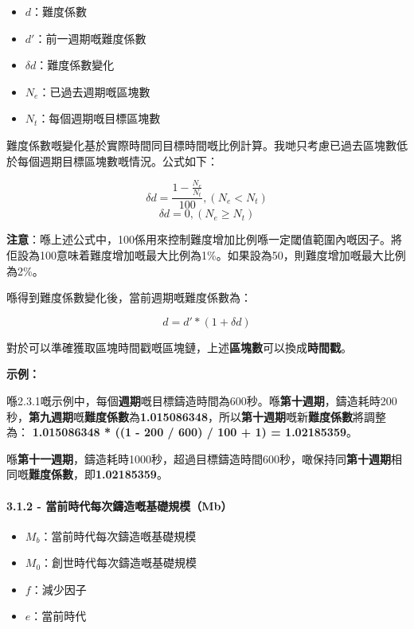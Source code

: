 \documentclass[
]{article}
\providecommand{\tightlist}{%
  \setlength{\itemsep}{0pt}\setlength{\parskip}{0pt}}
\begin{document}
\begin{itemize}
\tightlist
\item
  \(d\)：難度係數
\item
  \(d'\)：前一週期嘅難度係數
\item
  \(\delta d\)：難度係數變化
\item
  \(N_e\)：已過去週期嘅區塊數
\item
  \(N_t\)：每個週期嘅目標區塊數
\end{itemize}

難度係數嘅變化基於實際時間同目標時間嘅比例計算。我哋只考慮已過去區塊數低於每個週期目標區塊數嘅情況。公式如下：

\begin{equation}
\delta d = \frac{1-\frac{N_e}{N_t}}{100},(N_e < N_t)
\end{equation} \begin{equation}
\delta d = 0,(N_e \geq N_t)
\end{equation}

\textbf{注意}：喺上述公式中，100係用來控制難度增加比例喺一定閾值範圍內嘅因子。將佢設為100意味着難度增加嘅最大比例為1\%。如果設為50，則難度增加嘅最大比例為2\%。

喺得到難度係數變化後，當前週期嘅難度係數為：

\begin{equation}
d = d' * (1 + \delta d)
\end{equation}

對於可以準確獲取區塊時間戳嘅區塊鏈，上述\textbf{區塊數}可以換成\textbf{時間戳}。

\textbf{示例：}

喺2.3.1嘅示例中，每個\textbf{週期}嘅目標鑄造時間為600秒。喺\textbf{第十週期}，鑄造耗時200秒，\textbf{第九週期}嘅\textbf{難度係數}為\textbf{1.015086348}，所以\textbf{第十週期}嘅新\textbf{難度係數}將調整為：
\textbf{1.015086348 * ((1 - 200 / 600) / 100 + 1) = 1.02185359}。

喺\textbf{第十一週期}，鑄造耗時1000秒，超過目標鑄造時間600秒，噉保持同\textbf{第十週期}相同嘅\textbf{難度係數}，即\textbf{1.02185359}。

\paragraph{3.1.2 -
當前時代每次鑄造嘅基礎規模（Mb）}\label{ux7576ux524dux6642ux4ee3ux6bcfux6b21ux9444ux9020ux5605ux57faux790eux898fux6a21mb}

\begin{itemize}
\tightlist
\item
  \(M_b\)：當前時代每次鑄造嘅基礎規模
\item
  \(M_0\)：創世時代每次鑄造嘅基礎規模
\item
  \(f\)：減少因子
\item
  \(e\)：當前時代
\end{itemize}
\end{document}
